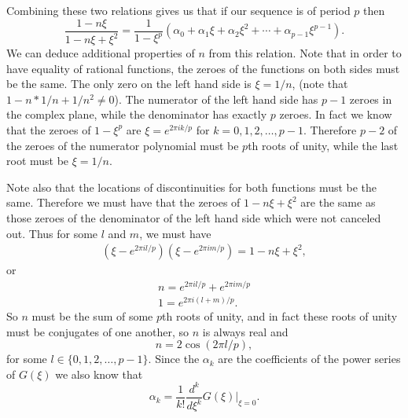 \documentclass[12pt]{article}
\begin{document}
Combining these two relations gives us that if our sequence is of period $p$ then 
\begin{equation*}
\frac{ 1 - n\xi}{1 - n \xi + \xi^2} = \frac{1}{1- \xi^p} (\alpha_0 + \alpha_1 \xi + \alpha_2 \xi^2 + \cdots + \alpha_{p-1} \xi^{p-1}).
\end{equation*}
We can deduce additional properties of $n$ from this relation. Note that in order to have equality of rational functions, the zeroes of the functions on both sides must be the same. 
The only zero on the left hand side is $\xi = 1/n$, (note that $1-n*1/n + 1/n^2 \neq 0$). The numerator of the left hand side has $p-1$ zeroes in the complex plane, while the denominator has exactly $p$ zeroes. In fact we know that the zeroes of $1 - \xi^p$ are $\xi = e^{2 \pi i k/p}$ for $k=0,1,2, \ldots, p-1$. Therefore $p-2$ of the zeroes of the numerator polynomial must be $p$th roots of unity, while the last root must be $\xi = 1/n$. 

Note also that the locations of discontinuities for both functions must be the same. Therefore we must have that the zeroes of $1-n\xi + \xi^2$ are the same as those zeroes of the denominator of the left hand side which were not canceled out. Thus for some $l$ and $m$, we must have 
\begin{align*}
(\xi - e^{2 \pi i l/p})(\xi - e^{2 \pi i m/p}) = 1 - n \xi + \xi^2,
\end{align*}
or 
\begin{align*}
n = e^{2 \pi i l/p} + e^{2 \pi i m/p} \\
1 = e^{2 \pi i (l+m)/p}.
\end{align*}
So $n$ must be the sum of some $p$th roots of unity, and in fact these roots of unity must be conjugates of one another, so $n$ is always real and 
\begin{equation*}
n= 2 \cos(2 \pi l/p), 
\end{equation*}
for some $l \in \{0, 1,2, \ldots, p-1\}$. 
Since the $\alpha_k$ are the coefficients of the power series of $G(\xi)$ we also know that 
\begin{equation*}
\alpha_k = \frac{1}{k!} \frac{d^k}{d \xi^k} G(\xi) |_{\xi=0}.
\end{equation*}
\end{document}
